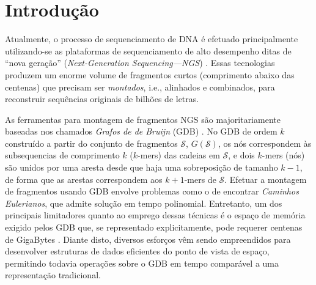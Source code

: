 \documentclass[12pt, a4paper, oneside]{article}
\newcommand{\A}{\ensuremath{\mathtt{A}}\xspace}
\newcommand{\C}{\ensuremath{\mathtt{C}}\xspace}
\newcommand{\G}{\ensuremath{\mathtt{G}}\xspace}
\newcommand{\T}{\ensuremath{\mathtt{T}}\xspace}
\newcommand{\strset}[1]{\ensuremath{\mathcal{#1}}\xspace}
\newcommand{\ssS}{\strset{S}}
\begin{document}
\clearpage
\setcounter{page}{1}
\section{Introdução}


Atualmente, o processo de sequenciamento de DNA é efetuado principalmente utilizando-se as plataformas de sequenciamento de alto desempenho ditas de ``nova geração'' (\textit{Next-Generation Sequencing---NGS}) \cite{Pop2008}. Essas tecnologias produzem um enorme volume de fragmentos curtos (comprimento abaixo das centenas) que precisam ser \emph{montados}, i.e., alinhados e combinados, para reconstruir sequências originais de bilhões de letras.

As ferramentas para montagem de fragmentos NGS são majoritariamente baseadas nos chamados \emph{Grafos de de Bruijn} (GDB) \cite{Compeau2011}. No GDB de ordem $k$ construído a partir do conjunto de fragmentos $\ssS$, $G(\ssS)$, os nós correspondem às subsequencias de comprimento $k$ ($k$-mers) das cadeias em \ssS, e dois $k$-mers (nós) são unidos por uma aresta desde que haja uma sobreposição de tamanho $k-1$, de forma que as arestas correspondem aos $k+1$-mers de \ssS.  Efetuar a montagem de fragmentos usando GDB envolve problemas como o de encontrar \emph{Caminhos Eulerianos}, que admite solução em tempo polinomial. Entretanto, um dos principais limitadores quanto ao emprego dessas técnicas é o espaço de memória exigido pelos GDB que, se representado explicitamente, pode requerer centenas de GigaBytes \cite{Conway2011}. Diante disto, diversos esforços vêm sendo empreendidos para desenvolver estruturas de dados eficientes do ponto de vista de espaço, permitindo todavia operações sobre o GDB em tempo comparável a uma representação tradicional.
\end{document}
